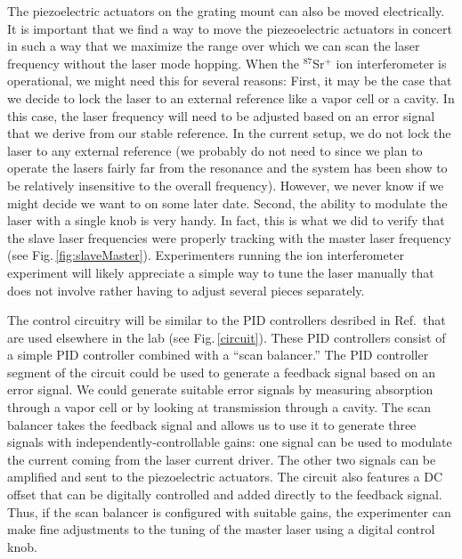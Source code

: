 The piezoelectric actuators on the grating mount can also be moved electrically. It is important that we find a way to move the piezeoelectric actuators in concert in such a way that we maximize the range over which we can scan the laser frequency without the laser mode hopping. When the $^{87}$Sr$^+$ ion interferometer is operational, we might need this for several reasons: First, it may be the case that we decide to lock the laser to an external reference like a vapor cell or a cavity. In this case, the laser frequency will need to be adjusted based on an error signal that we derive from our stable reference. In the current setup, we do not lock the laser to any external reference (we probably do not need to since we plan to operate the lasers fairly far from the resonance and the system has been show to be relatively insensitive to the overall frequency). However, we never know if we might decide we want to on some later date. Second, the ability to modulate the laser with a single knob is very handy. In fact, this is what we did to verify that the slave laser frequencies were properly tracking with the master laser frequency (see Fig.\,\ref{fig:slaveMaster}). Experimenters running the ion interferometer experiment will likely appreciate a simple way to tune the laser manually that does not involve rather having to adjust several pieces separately. 


The control circuitry will be similar to the PID controllers desribed in Ref.\,\cite{cjeDiss} that are used elsewhere in the lab (see Fig.\,\ref{circuit}). These PID controllers consist of a simple PID controller combined with a ``scan balancer.'' The PID controller segment of the circuit could be used to generate a feedback signal based on an error signal. We could generate suitable error signals by measuring absorption through a vapor cell or by looking at transmission through a cavity. The scan balancer takes the feedback signal and allows us to use it to generate three signals with independently-controllable gains: one signal can be used to modulate the current coming from the laser current driver. The other two signals can be amplified and sent to the piezoelectric actuators.  The circuit also features a DC offset that can be digitally controlled and added directly to the feedback signal. Thus, if the scan balancer is configured with suitable gains, the experimenter can make fine adjustments to the tuning of the master laser using a digital control knob.

